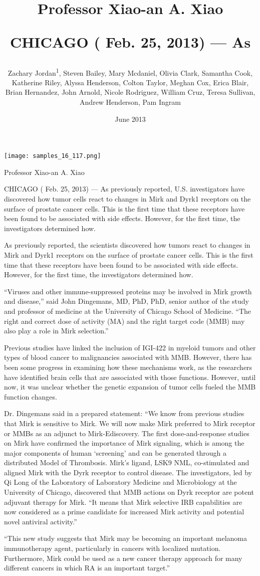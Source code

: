 \documentclass{article}
\title{Professor Xiao-an A. Xiao

CHICAGO ( Feb. 25, 2013) — As}
\author{Zachary Jordan\textsuperscript{1},  Steven Bailey,  Mary Mcdaniel,  Olivia Clark,  Samantha Cook,  Katherine Riley,  Alyssa Henderson,  Colton Taylor,  Meghan Cox,  Erica Blair,  Brian Hernandez,  John Arnold,  Nicole Rodriguez,  William Cruz,  Teresa Sullivan,  Andrew Henderson,  Pam Ingram}
\affil{\textsuperscript{1}Institute for High Energy Physics}
\date{June 2013}
\begin{document}
\maketitle

\begin{center}
\begin{minipage}{0.75\linewidth}
\texttt{[image: samples\_16\_117.png]}
\end{minipage}
\end{center}

Professor Xiao-an A. Xiao

CHICAGO ( Feb. 25, 2013) — As previously reported, U.S. investigators have discovered how tumor cells react to changes in Mirk and Dyrk1 receptors on the surface of prostate cancer cells. This is the first time that these receptors have been found to be associated with side effects. However, for the first time, the investigators determined how.

As previously reported, the scientists discovered how tumors react to changes in Mirk and Dyrk1 receptors on the surface of prostate cancer cells. This is the first time that these receptors have been found to be associated with side effects. However, for the first time, the investigators determined how.

“Viruses and other immune-suppressed proteins may be involved in Mirk growth and disease,” said John Dingemans, MD, PhD, PhD, senior author of the study and professor of medicine at the University of Chicago School of Medicine. “The right and correct dose of activity (MA) and the right target code (MMB) may also play a role in Mirk selection.”

Previous studies have linked the inclusion of IGI-422 in myeloid tumors and other types of blood cancer to malignancies associated with MMB. However, there has been some progress in examining how these mechanisms work, as the researchers have identified brain cells that are associated with those functions. However, until now, it was unclear whether the genetic expansion of tumor cells fueled the MMB function changes.

Dr. Dingemans said in a prepared statement: “We know from previous studies that Mirk is sensitive to Mirk. We will now make Mirk preferred to Mirk receptor or MMBs as an adjunct to Mirk-Ediscovery. The first dose-and-response studies on Mirk have confirmed the importance of Mirk signaling, which is among the major components of human ‘screening’ and can be generated through a distributed Model of Thrombosis. Mirk’s ligand, LSK9 NML, co-stimulated and aligned Mirk with the Dyrk receptor to control disease. The investigators, led by Qi Long of the Laboratory of Laboratory Medicine and Microbiology at the University of Chicago, discovered that MMB actions on Dyrk receptor are potent adjuvant therapy for Mirk. “It means that Mirk selective IRB capabilities are now considered as a prime candidate for increased Mirk activity and potential novel antiviral activity.”

“This new study suggests that Mirk may be becoming an important melanoma immunotherapy agent, particularly in cancers with localized mutation. Furthermore, Mirk could be used as a new cancer therapy approach for many different cancers in which RA is an important target.”
\end{document}
